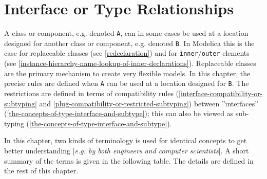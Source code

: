 \chapter{Interface or Type Relationships}

A class or component, e.g. denoted \lstinline!A!, can in some cases be used at a
location designed for another class or component, e.g. denoted \lstinline!B!. In
Modelica this is the case for replaceable classes (see \autoref{redeclaration}) and
for \lstinline!inner!/\lstinline!outer! elements (see \autoref{instance-hierarchy-name-lookup-of-inner-declarations}).
Replaceable classes are the
primary mechanism to create very flexible models. In this chapter, the
precise rules are defined when \lstinline!A! can be used at a location designed for
\lstinline!B!. The restrictions are defined in terms of compatibility rules
(\autoref{interface-compatibility-or-subtyping} and \autoref{plug-compatibility-or-restricted-subtyping}) between ''interfaces'' (\autoref{the-concepts-of-type-interface-and-subtype}); this can
also be viewed as sub-typing (\autoref{the-concepts-of-type-interface-and-subtype}).

In this chapter, two kinds of terminology is used for identical concepts
to get better understanding {[}\emph{e.g. by both engineers and computer
scientists}{]}. A short summary of the terms is given in the following
table. The details are defined in the rest of this chapter.

